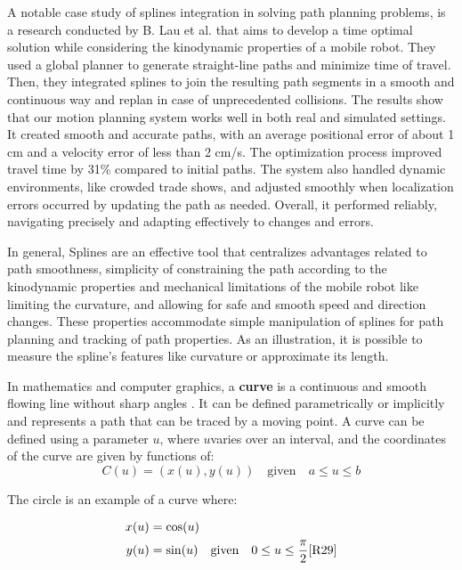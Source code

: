 A notable case study of splines integration in solving path planning problems, is a research conducted 
by B. Lau et al. \cite{R30} that aims to develop a time optimal solution while considering the kinodynamic 
properties of a mobile robot. They used a global planner to generate straight-line paths and minimize time 
of travel. Then, they  integrated splines to join the resulting path segments in a smooth and continuous 
way and replan in case of unprecedented collisions. The results show that our motion planning system works 
well in both real and simulated settings. It created smooth and accurate paths, with an average positional 
error of about 1 cm and a velocity error of less than 2 cm/s. The optimization process improved travel 
time by 31\% compared to initial paths. The system also handled dynamic environments, like crowded trade 
shows, and adjusted smoothly when localization errors occurred by updating the path as needed. Overall, 
it performed reliably, navigating precisely and adapting effectively to changes and errors.

In general, Splines are an effective tool that centralizes advantages related to path smoothness,
simplicity of constraining the path according to the kinodynamic properties and mechanical
limitations of the mobile robot like limiting the curvature, and allowing for safe and smooth
speed and direction changes. These properties accommodate simple manipulation of splines for
path planning and tracking of path properties. As an illustration, it is possible to measure the
spline’s features like curvature or approximate its length.


In mathematics and computer graphics, a \textbf{curve} is a continuous and smooth flowing line without 
sharp angles . 
It can be defined parametrically or implicitly and represents a path that can be traced by a moving point.
A curve can be defined using a parameter 
\(u\), where \(u\)varies over an interval, and the coordinates of the curve are given by functions of:
\begin{equation}
    C(u) = (x(u), y(u)) \quad \text{given} \quad a \leq u \leq b \label{eq:curve}
\end{equation}

The circle is an example of a curve where:

\hspace*{-1cm} %
\begin{align}
    x(u) &= \cos(u) \\
    y(u) &= \sin(u) \quad \text{given} \quad 0 \leq u \leq \frac{\pi}{2}     \cite{R29}
\end{align}

